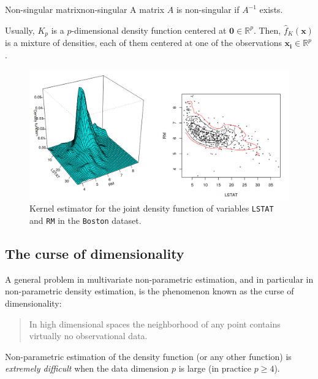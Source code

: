 \begin{definition}{Non-singular matrix}{non-singular}
	A matrix $A$ is non-singular if $A^{-1}$ exists.
\end{definition}

Usually, $K_p$ is a $p$-dimensional density function centered at $\boldsymbol{0} \in \mathbb{R}^p$.
Then, $\hat{f}_K(\boldsymbol{x})$ is a mixture of densities, each of them centered at one of
the observations $\boldsymbol{x_i} \in \mathbb{R}^p$.

\begin{figure}[H]
	\includegraphics{figures/multivariate-kernel-density}
	\caption{Kernel estimator for the joint density function of variables
		\texttt{LSTAT} and \texttt{RM} in the \texttt{Boston} dataset.}
\end{figure}

\subsection{The curse of dimensionality}%
\label{sec:curse-of-dimensionality}%
A general problem in multivariate non-parametric estimation, and in
particular in non-parametric density estimation, is the phenomenon
known as the curse of dimensionality:
\begin{quote}
	In high dimensional spaces the neighborhood of any point contains
	virtually no observational data.
\end{quote}

\begin{marker}
	Non-parametric estimation of the density function (or any other
    function) is \emph{extremely difficult} when the data dimension $p$ is large
	(in practice $p \geq 4$).
\end{marker}

